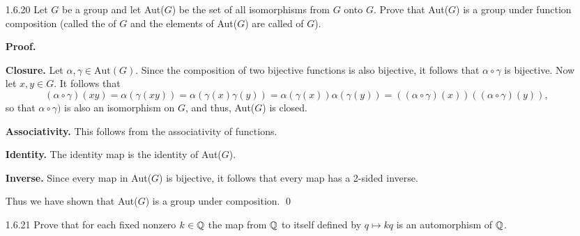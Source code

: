 \begin{enumerate}
      \textbf{Proof.} Consider an integer $k > 1$ and the map
      $\alpha : G \rightarrow G$, $g \mapsto g^k$. Let $x, y \in G$. The map
      $\alpha$ is a homomorphism since
      $\alpha(xy) = (xy)^k = x^ky^k = \alpha(x)\alpha(y)$. Since $x \in G$, it
      follows that $x^m = 1$ for some positive integer $m$. Notice that
      $x^{1/k} \in G$ since $(x^{1/k})^{km} = 1$. Thus $\alpha$ is onto because
      $\alpha(x^{1/k}) = x$. Now consider the complex number
      $e^{2\pi/k} = \cos2\pi/k + i \sin2\pi/k$. Notice that $e^{2\pi/k} \in G$
      since $(e^{2\pi/k})^k = 1$. Also notice that $e^{2\pi/k} \neq 1$ (since
      $2\pi/k$ is not a multiple of $2\pi$), but we have that
      $\alpha(e^{2\pi/k}) = \alpha(1) = 1$, so that $\alpha$ is not injective; 
      i.e, $\alpha$ is not an isomorphism. \qed
   \item[1.6.20]  Let $G$ be a group and let Aut($G$) be the set of all
                  isomorphisms from $G$ onto $G$. Prove that Aut($G$) is a
                  group under function composition (called the
                   of $G$ and the elements of Aut($G$)
                  are called  of $G$).

      \textbf{Proof.}

      \textbf{Closure.} Let $\alpha, \gamma \in \text{Aut}(G)$. Since the
      composition of two bijective functions is also bijective, it follows that
      $\alpha \circ \gamma$ is bijective. Now let $x, y \in G$. It follows that
      $$(\alpha\circ\gamma)(xy) = \alpha(\gamma(xy)) =
         \alpha(\gamma(x)\gamma(y)) = \alpha(\gamma(x))\alpha(\gamma(y)) =
         ((\alpha\circ\gamma)(x))((\alpha\circ\gamma)(y)),$$
      so that $\alpha\circ\gamma)$ is also an isomorphism on $G$, and thus,
      Aut($G$) is closed.

      \textbf{Associativity.} This follows from the associativity of functions.

      \textbf{Identity.} The identity map is the identity of Aut($G$).

      \textbf{Inverse.} Since every map in Aut($G$) is bijective, it follows 
      that every map has a 2-sided inverse.

      Thus we have shown that Aut($G$) is a group under composition. \qed      
   \item[1.6.21]  Prove that for each fixed nonzero $k \in \mathbb{Q}$ the map from $\mathbb{Q}$
                  to itself defined by $q \mapsto kq$ is an automorphism of
                  $\mathbb{Q}$.


\end{enumerate}
